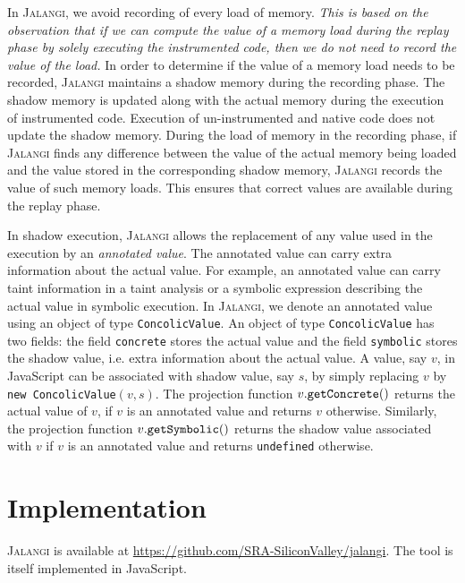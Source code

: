 \documentclass{sig-alternate}
\def\jalangi{\textsc{Jalangi}}
\newcommand \Actual{{\tt getConcrete()}}
\newcommand \Shadow{{\tt getSymbolic()}}
\begin{document}
In \jalangi{}, we avoid recording of every load of memory.  \emph{This
  is based on the observation that if we can compute the value of a
  memory load during the replay phase by solely executing the
  instrumented code, then we do not need to record the value of the
  load.}  In order to determine if the value of a memory load needs to
be recorded, \jalangi{} maintains a shadow memory during the recording
phase.  The shadow memory is updated along with the actual memory
during the execution of instrumented code.  Execution of
un-instrumented and native code does not update the shadow memory.
During the load of memory in the recording phase, if \jalangi{} finds
any difference between the value of the actual memory being loaded and
the value stored in the corresponding shadow memory, \jalangi{}
records the value of such memory loads. This ensures that correct
values are available during the replay phase.

In shadow execution, \jalangi{} allows the replacement of any value
used in the execution by an \emph{annotated value}.  The annotated
value can carry extra information about the actual value.  For
example, an annotated value can carry taint information in a taint
analysis or a symbolic expression describing the actual value in
symbolic execution.  In \jalangi{}, we denote an annotated value using
an object of type \texttt{ConcolicValue}.  An object of type
\texttt{ConcolicValue} has two fields: the field \texttt{concrete}
stores the actual value and the field \texttt{symbolic} stores the
shadow value, i.e. extra information about the actual value.  A value,
say $v$, in JavaScript can be associated with shadow value, say $s$,
by simply replacing $v$ by \texttt{new ConcolicValue}$(v, s)$.  The
projection function $v.\Actual$ returns the actual value of $v$, if
$v$ is an annotated value and returns $v$ otherwise.  Similarly, the
projection function $v.\Shadow$ returns the shadow value associated
with $v$ if $v$ is an annotated value and returns \texttt{undefined}
otherwise.


\section{Implementation}
\label{sec:implementation}

\jalangi{} is available at
\url{https://github.com/SRA-SiliconValley/jalangi}.  The tool is
itself implemented in JavaScript.  
\end{document}
